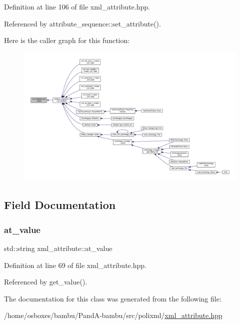 Definition at line 106 of file xml\+\_\+attribute.\+hpp.



Referenced by attribute\+\_\+sequence\+::set\+\_\+attribute().

Here is the caller graph for this function\+:
\nopagebreak
\begin{figure}[H]
\begin{center}
\leavevmode
\includegraphics[width=350pt]{d8/dd2/classxml__attribute_a957e710a1b24e0f175a663d4a4ab1ced_icgraph}
\end{center}
\end{figure}


\subsection{Field Documentation}
\mbox{\label{classxml__attribute_ae69b94ad6d9c8f19c7ce8977310961c9}} 
\subsubsection{\texorpdfstring{at\+\_\+value}{at\_value}}
{\footnotesize\ttfamily std\+::string xml\+\_\+attribute\+::at\+\_\+value\hspace{0.3cm}{\ttfamily [private]}}



Definition at line 69 of file xml\+\_\+attribute.\+hpp.



Referenced by get\+\_\+value().



The documentation for this class was generated from the following file\+:\begin{DoxyCompactItemize}
\item 
/home/osboxes/bambu/\+Pand\+A-\/bambu/src/polixml/\hyperlink{xml__attribute_8hpp}{xml\+\_\+attribute.\+hpp}\end{DoxyCompactItemize}
